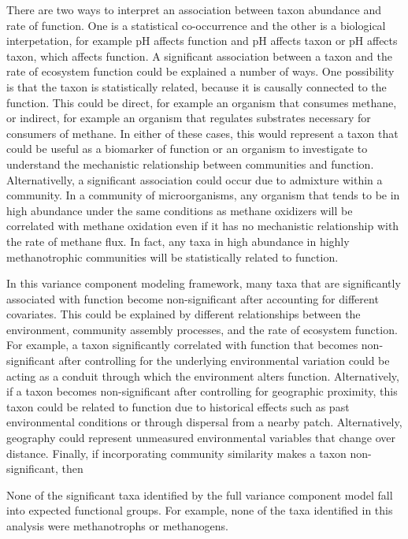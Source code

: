 \documentclass{article}
\begin{document}
There are two ways to interpret an association between taxon abundance and rate
of function. One is a statistical co-occurrence and the other is a biological
interpetation, for example pH affects function and pH affects taxon or pH
affects taxon, which affects function.
A significant association between a taxon and the rate of ecosystem function
could be explained a number of ways. One possibility is that the taxon is
statistically related, because it is causally connected to the function. This
could be direct, for example an organism that consumes methane, or indirect, for
example an organism that regulates substrates necessary for consumers of
methane. In either of these cases, this would represent a taxon that could be
useful as a biomarker of function or an organism to investigate to understand
the mechanistic relationship between communities and function. Alternativelly, a significant
association could occur due to admixture within a community. In a community of
microorganisms, any organism that tends to be in high abundance under the same
conditions as methane oxidizers will be correlated with methane oxidation even
if it has no mechanistic relationship with the rate of methane flux. In fact,
any taxa in high abundance in highly methanotrophic communities will be
statistically related to function.

In this variance component modeling framework, many taxa that are significantly
associated with function become non-significant after accounting for different
covariates. This could be explained by different relationships between the
environment, community assembly processes, and the rate of ecosystem function.
For example, a taxon significantly correlated with function that becomes
non-significant after controlling for the underlying environmental variation
could be acting as a conduit through which the environment alters function.
Alternatively, if a taxon becomes non-significant after controlling for
geographic proximity, this taxon could be related to function due to historical
effects such as past environmental conditions or through dispersal from a nearby
patch. Alternatively, geography could represent unmeasured environmental
variables that change over distance. Finally, if incorporating community
similarity makes a taxon non-significant, then 

None of the significant taxa identified by the full variance component model 
fall into expected functional groups. For example, none of the taxa identified
in this analysis were methanotrophs or methanogens.
\end{document}
